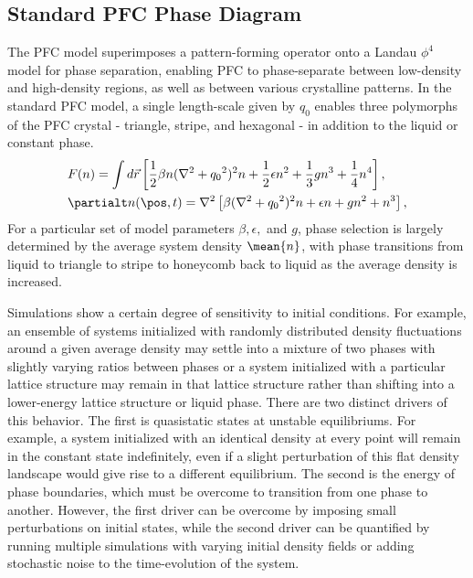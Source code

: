 
\label{appendix:pfc-phase-diagram}
\subsection{Standard PFC Phase Diagram}

The PFC model superimposes a pattern-forming operator onto a Landau $\phi^4$ model for phase separation, enabling PFC to phase-separate between low-density and high-density regions, as well as between various crystalline patterns.  In the standard PFC model, a single length-scale given by $q_0$ enables three polymorphs of the PFC crystal - triangle, stripe, and hexagonal - in addition to the liquid or constant phase.
%
\begin{subequations}
\begin{align}
& F(n) = \int d\vec{r} \left[ \frac{1}{2}\beta n (\nabla^2 + {q_0}^2)^2 n + \frac{1}{2} \epsilon n^2 + \frac{1}{3} g n^3 + \frac{1}{4} n^4 \right], \label{eq-phase-diagram-std-pfc-energy} \\
& \partialt n(\pos, t) = \nabla^2 \left[ \beta (\nabla^2 + {q_0}^2)^2 n + \epsilon n + g n^2 + n^3 \right], \label{eq-phase-diagram-std-pfc-dndt}
\end{align}
\end{subequations}
%
For a particular set of model parameters $\beta, \epsilon,$ and $g$, phase selection is largely determined by the average system density $\mean{n}$, with phase transitions from liquid to triangle to stripe to honeycomb back to liquid as the average density is increased.

Simulations show a certain degree of sensitivity to initial conditions.  For example, an ensemble of systems initialized with randomly distributed density fluctuations around a given average density may settle into a mixture of two phases with slightly varying ratios between phases or a system initialized with a particular lattice structure may remain in that lattice structure rather than shifting into a lower-energy lattice structure or liquid phase.  There are two distinct drivers of this behavior.  The first is quasistatic states at unstable equilibriums.  For example, a system initialized with an identical density at every point will remain in the constant state indefinitely, even if a slight perturbation of this flat density landscape would give rise to a different equilibrium.  The second is the energy of phase boundaries, which must be overcome to transition from one phase to another.  However, the first driver can be overcome by imposing small perturbations on initial states, while the second driver can be quantified by running multiple simulations with varying initial density fields or adding stochastic noise to the time-evolution of the system.

